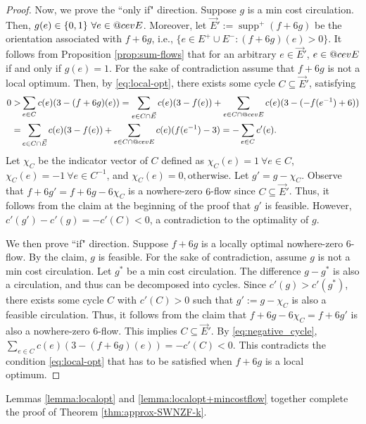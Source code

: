 \documentclass[11pt]{article}
\makeatletter
\DeclareRobustCommand{\cev}[1]{{\mathpalette\do@cev{#1}}}
\newcommand{\do@cev}[2]{\vbox{\offinterlineskip
    \sbox\z@{$\m@th#1 x$}\ialign{##\cr
      \hidewidth\reflectbox{$\m@th#1\vec{}\mkern4mu$}\hidewidth\cr
      \noalign{\kern-\ht\z@}
      $\m@th#1#2$\cr
    }}}
\DeclareMathOperator{\supp}{supp}
\makeatother
\begin{document}
\begin{proof}
    Now, we prove the ``only if" direction. Suppose $g$ is a min cost circulation. Then, $g(e)\in\{0,1\}\ \forall e\in \cev{E}$. Moreover, let $\vec{E}':=\supp^+(f+6g)$ be the orientation associated with $f+6g$, i.e., $\{e\in E^+\cup E^-: (f+6g)(e)>0\}$. It follows from Proposition \ref{prop:sum-flows} that for an arbitrary $e\in \vec{E}'$, $e\in \cev{E}$ if and only if $g(e)=1$. For the sake of contradiction assume that $f+6g$ is not a local optimum. Then, by \eqref{eq:local-opt}, there exists some cycle $C\subseteq \vec{E}'$, satisfying 
    \begin{equation}\label{eq:negative_cycle}
        \begin{aligned}
            0>&\sum_{e\in C} c(e)(3-(f+6g)(e))=\sum_{e\in C\cap \vec{E}} c(e)(3-f(e))+\sum_{e\in C\cap \cev{E}} c(e)(3-(-f(e^{-1})+6))\\
            =&\sum_{e\in C\cap \vec{E}} c(e)(3-f(e))+\sum_{e\in C\cap \cev{E}} c(e)(f(e^{-1})-3)=-\sum_{e\in C}c'(e).
        \end{aligned}
    \end{equation}
    Let $\chi_C$ be the indicator vector of $C$ defined as $\chi_C(e)=1\ \forall e\in C$, $\chi_C(e)=-1\ \forall e\in C^{-1}$, and $\chi_C(e)=0, \text{otherwise}$.
    Let $g'=g-\chi_C$. Observe that $f+6g'=f+6g-6\chi_C$ is a nowhere-zero $6$-flow since $C\subseteq\vec{E}'$. Thus, it follows from the claim at the beginning of the proof that $g'$ is feasible. However, $c'(g')-c'(g)=-c'(C)<0$, a contradiction to the optimality of $g$. 


    We then prove ``if" direction. Suppose $f+6g$ is a locally optimal nowhere-zero $6$-flow. By the claim, $g$ is feasible. For the sake of contradiction, assume $g$ is not a min cost circulation. Let $g^*$ be a min cost circulation. The difference $g-g^*$ is also a circulation, and thus can be decomposed into cycles. Since $c'(g)>c'(g^*)$, there exists some cycle $C$ with $c'(C)>0$ such that $g':=g-\chi_C$ is also a feasible circulation. Thus, it follows from the claim that $f+6g-6\chi_C=f+6g'$ is also a nowhere-zero $6$-flow. This implies $C\subseteq \vec{E}'$. By \eqref{eq:negative_cycle}, $\sum_{e\in C} c(e)(3-(f+6g)(e))=-c'(C)<0$. This contradicts the condition \eqref{eq:local-opt} that has to be satisfied when $f+6g$ is a local optimum.
\end{proof}

Lemmas \ref{lemma:localopt} and \ref{lemma:localopt+mincostflow} together complete the proof of Theorem \ref{thm:approx-SWNZF-k}.
\end{document}

